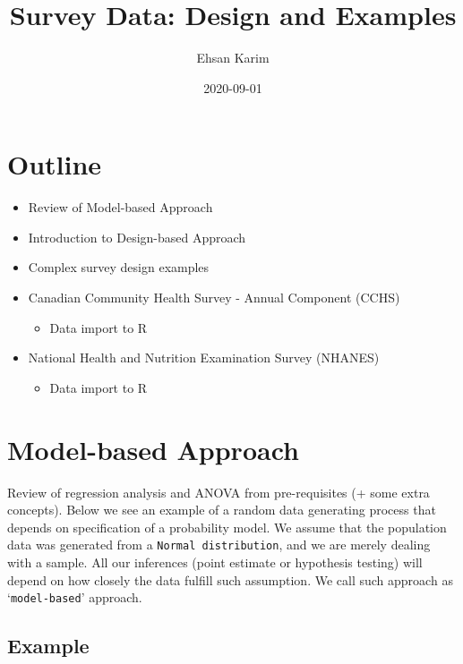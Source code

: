 \documentclass[
]{book}
\title{Survey Data: Design and Examples}
\author{Ehsan Karim}
\date{2020-09-01}
\providecommand{\tightlist}{%
  \setlength{\itemsep}{0pt}\setlength{\parskip}{0pt}}
\begin{document}
\maketitle

{
\setcounter{tocdepth}{1}
\tableofcontents
}
\hypertarget{outline}{%
\chapter{Outline}\label{outline}}

\begin{itemize}
\tightlist
\item
  Review of Model-based Approach
\item
  Introduction to Design-based Approach
\item
  Complex survey design examples
\item
  Canadian Community Health Survey - Annual Component (CCHS)

  \begin{itemize}
  \tightlist
  \item
    Data import to R
  \end{itemize}
\item
  National Health and Nutrition Examination Survey (NHANES)

  \begin{itemize}
  \tightlist
  \item
    Data import to R
  \end{itemize}
\end{itemize}

\hypertarget{tab-3}{%
\chapter{Model-based Approach}\label{tab-3}}

Review of regression analysis and ANOVA from pre-requisites (+ some extra concepts). Below we see an example of a random data generating process that depends on specification of a probability model. We assume that the population data was generated from a \texttt{Normal\ distribution}, and we are merely dealing with a sample. All our inferences (point estimate or hypothesis testing) will depend on how closely the data fulfill such assumption. We call such approach as `\texttt{model-based}' approach.

\hypertarget{example}{%
\section{Example}\label{example}}
\end{document}
